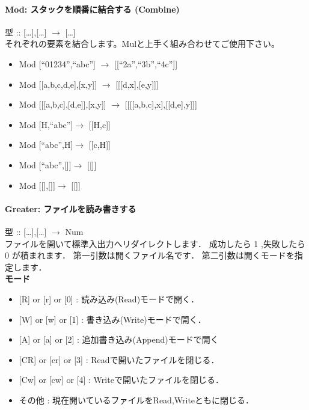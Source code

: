 \paragraph{Mod: スタックを順番に結合する (Combine)}

型 :: {[}\ldots{}{]},{[}\ldots{}{]} $\to$
{[}\ldots{}{]}\\それぞれの要素を結合します。Mulと上手く組み合わせてご使用下さい。

\begin{itemize}
\item
  Mod {[}``01234'',``abc''{]} $\to$
  {[}{[}``2a'',``3b'',``4c''{]}{]}
\item
  Mod {[}{[}a,b,c,d,e{]},{[}x,y{]}{]} $\to$
  {[}{[}{[}d,x{]},{[}e,y{]}{]}{]}
\item
  Mod {[}{[}{[}a,b,c{]},{[}d,e{]}{]},{[}x,y{]}{]} $\to$
  {[}{[}{[}{[}a,b,c{]},x{]},{[}{[}d,e{]},y{]}{]}{]}
\item
  Mod {[}H,``abc''{]}$\to$ {[}{[}H,c{]}{]}
\item
  Mod {[}``abc'',H{]}$\to$ {[}{[}c,H{]}{]}
\item
  Mod {[}``abc'',{[}{]}{]}$\to$ {[}{[}{]}{]}
\item
  Mod {[}{[}{]},{[}{]}{]}$\to$ {[}{[}{]}{]}
\end{itemize}

\paragraph{Greater: ファイルを読み書きする}

型 :: {[}\ldots{}{]},{[}\ldots{}{]} $\to$
Num\\ファイルを開いて標準入出力へリダイレクトします． 成功したら 1
,失敗したら 0 が積まれます． 第一引数は開くファイル名です．
第二引数は開くモードを指定します．\\\textbf{モード}

\begin{itemize}
\item
  {[}R{]} or {[}r{]} or {[}0{]} : 読み込み(Read)モードで開く．
\item
  {[}W{]} or {[}w{]} or {[}1{]} : 書き込み(Write)モードで開く．
\item
  {[}A{]} or {[}a{]} or {[}2{]} : 追加書き込み(Append)モードで開く
\item
  {[}CR{]} or {[}cr{]} or {[}3{]} : Readで開いたファイルを閉じる．
\item
  {[}Cw{]} or {[}cw{]} or {[}4{]} : Writeで開いたファイルを閉じる．
\item
  その他 : 現在開いているファイルをRead,Writeともに閉じる．
\end{itemize}

